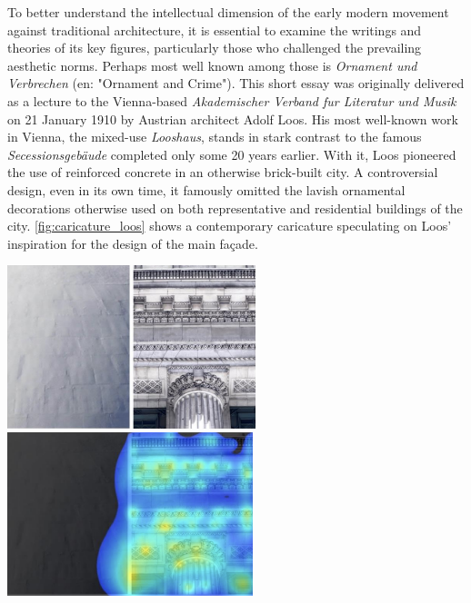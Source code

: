 \documentclass[a4paper]{article}
\begin{document}
\begin{mdframed}[linewidth=1pt, roundcorner=5pt, innerleftmargin=10pt, innerrightmargin=10pt, innertopmargin=10pt, innerbottommargin=10pt, linecolor=black, backgroundcolor=white, userdefinedwidth=\textwidth]
    To better understand the intellectual dimension of the early modern movement against traditional architecture, it is essential to examine the writings and theories of its key figures, particularly those who challenged the prevailing aesthetic norms. Perhaps most well known among those is \textit{Ornament und Verbrechen} \cite{loos_ornament_1908} (en: "Ornament and Crime"). This short essay was originally delivered as a lecture to the Vienna-based \textit{Akademischer Verband fur Literatur und Musik} on 21 January 1910 by Austrian architect Adolf Loos. His most well-known work in Vienna, the mixed-use \textit{Looshaus}, stands in stark contrast to the famous \textit{Secessionsgebäude} completed only some 20 years earlier. With it, Loos pioneered the use of reinforced concrete in an otherwise brick-built city. A controversial design, even in its own time, it famously omitted the lavish ornamental decorations otherwise used on both representative and residential buildings of the city. \cref{fig:caricature_loos} shows a contemporary caricature speculating on Loos' inspiration for the design of the main façade.

    \centering %
    \includegraphics[height=4.75cm]{figures/beautyscale_image.png}
    \includegraphics[height=4.75cm]{figures/beautyscale_heatmap.png}
    \label{fig:caricature_loos}
\end{mdframed}
\end{document}
